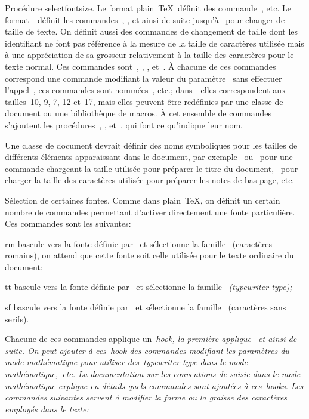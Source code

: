 \formalpar Procédure selectfontsize.
Le format plain~\TeX\ définit des commande~, etc. Le
format~\brTeX\ définit les commandes~, ,
et ainsi de suite jusqu'à~ pour changer de taille de
texte. On définit aussi des commandes de changement de taille dont les
identifiant ne font pas référence à la mesure de la taille de
caractères utilisée mais à une appréciation de sa grosseur relativement
à la taille des caractères pour le texte normal. Ces commandes
sont~, , , 
et~. À chacune de ces commandes correspond une
commande modifiant la valeur du paramètre~ sans effectuer
l'appel~, ces commandes sont
nommées~, etc.; dans~\brTeX\ elles correspondent aux
tailles~10, 9, 7, 12 et~17, mais elles peuvent être redéfinies par une
classe de document ou une bibliothèque de macros. À cet ensemble de
commandes s'ajoutent les procédures~,
,  et~, qui font ce
qu'indique leur nom.

Une classe de document devrait définir des noms symboliques pour les
tailles de différents éléments apparaissant dans le document, par
exemple~ ou~ pour une
commande chargeant la taille utilisée pour préparer le titre du
document,~ pour charger la taille des caractères
utilisée pour préparer les notes de bas page, etc.


\formalpar Sélection de certaines fontes.
Comme dans plain~\TeX, on définit un certain nombre de commandes
permettant d'activer directement une fonte particulière. Ces commandes
sont les suivantes:
\begindescription\functions
\item rm
  bascule vers la fonte définie par~ et sélectionne
  la famille~ (caractères romains), on attend que
  cette fonte soit celle utilisée pour le texte ordinaire du document;

\item tt
  bascule vers la fonte définie par~ et sélectionne
  la famille~ \em{(typewriter type)\/};

\item sf
  bascule vers la fonte définie par~ et sélectionne
  la famille~ (caractères sans serifs).

\enddescription
Chacune de ces commandes applique un~\em{hook}, la première
applique~ et ainsi de suite. On peut ajouter à
ces~\em{hook} des commandes modifiant les paramètres du mode
mathématique pour utiliser des~\em{typewriter type} dans le mode
mathématique,~etc. La documentation sur les conventions de saisie dans
le mode mathématique explique en détails quels commandes sont ajoutées
à ces~\em{hooks}. Les commandes suivantes servent à modifier la forme
ou la graisse des caractères employés dans le texte:
\begindescription%

